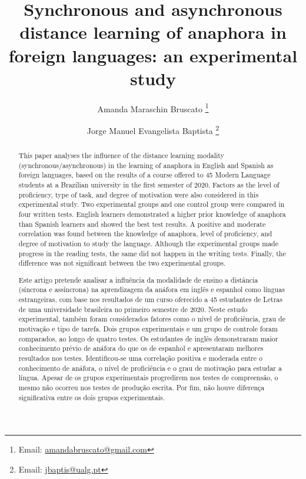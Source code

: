 \documentclass{textolivre}
\title{Synchronous and asynchronous distance learning of anaphora in foreign languages: an experimental study}
\author[1]{Amanda Maraschin Bruscato \orcid{0000-0003-0660-9098} \thanks{Email: \url{amandabruscato@gmail.com}}}
\author[1]{Jorge Manuel Evangelista Baptista \orcid{0000-0003-4603-4364} \thanks{Email: \url{jbaptis@ualg.pt}}}
\affil[1]{Universidade do Algare, Portugal.}
\begin{document}
\maketitle

\begin{polyabstract}
\begin{abstract}
This paper analyses the influence of the distance learning modality
(synchronous/asynchronous) in the learning of anaphora in English and Spanish
as foreign languages, based on the results of a course offered to 45 Modern
Language students at a Brazilian university in the first semester of 2020.
Factors as the level of proficiency, type of task, and degree of motivation
were also considered in this experimental study. Two experimental groups and
one control group were compared in four written tests. English learners
demonstrated a higher prior knowledge of anaphora than Spanish learners and
showed the best test results. A positive and moderate correlation was found
between the knowledge of anaphora, level of proficiency, and degree of
motivation to study the language. Although the experimental groups made
progress in the reading tests, the same did not happen in the writing tests.
Finally, the difference was not significant between the two experimental
groups.

\end{abstract}

\begin{portuguese}
\begin{abstract}
Este artigo pretende analisar a influência da modalidade de ensino a distância
(síncrona e assíncrona) na aprendizagem da anáfora em inglês e espanhol como
línguas estrangeiras, com base nos resultados de um curso oferecido a 45
estudantes de Letras de uma universidade brasileira no primeiro semestre de
2020. Neste estudo experimental, também foram considerados fatores como o nível
de proficiência, grau de motivação e tipo de tarefa. Dois grupos experimentais
e um grupo de controle foram comparados, ao longo de quatro testes. Os
estudantes de inglês demonstraram maior conhecimento prévio de anáfora do que
os de espanhol e apresentaram melhores resultados nos testes. Identificou-se
uma correlação positiva e moderada entre o conhecimento de anáfora, o nível de
proficiência e o grau de motivação para estudar a língua. Apesar de os grupos
experimentais progredirem nos testes de compreensão, o mesmo não ocorreu nos
testes de produção escrita. Por fim, não houve diferença significativa entre os
dois grupos experimentais.

\end{abstract}
\end{portuguese}

\end{polyabstract}
\end{document}

